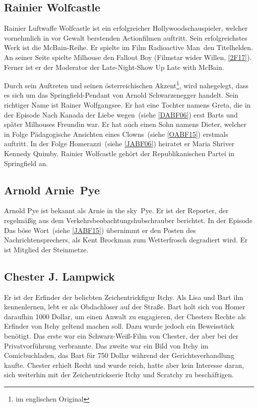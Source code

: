 \subsection{Rainier Wolfcastle}\label{RainierWolfcastle}
Rainier Luftwaffe Wolfcastle ist ein erfolgreicher Hollywoodschauspieler, welcher vornehmlich in vor Gewalt berstenden Actionfilmen auftritt. Sein erfolgreichstes Werk ist die McBain-Reihe. Er spielte im Film \glqq Radioactive Man\grqq\ den Titelhelden. An seiner Seite spielte Milhouse den Fallout Boy (\glqq Filmstar wider Willen\grqq , \ref{2F17}). Ferner ist er der Moderator der Late-Night-Show \glqq Up Late with McBain\grqq .

Durch sein Auftreten und seinen österreichischen Akzent\footnote{im englischen Original}, wird nahegelegt, dass es sich um das Springfield-Pendant von Arnold Schwarzenegger handelt. Sein richtiger Name ist Rainer Wolfgangsee. Er hat eine Tochter namens Greta, die in der Episode \glqq Nach Kanada der Liebe wegen\grqq\ (siehe \ref{DABF06}) erst Barts und später Milhouses Freundin war. Er hat auch einen Sohn namens Dieter, welcher in Folge \glqq Pädagogische Ansichten eines Clowns\grqq\ (siehe \ref{OABF15}) erstmals auftritt. In der Folge \glqq Homerazzi\grqq\ (siehe \ref{JABF06}) heiratet er Maria Shriver Kennedy Quimby. Rainier Wolfcastle gehört der Republikanischen Partei in Springfield an.


\subsection{Arnold \glqq Arnie\grqq\ Pye}\label{ArniePye}
Arnold Pye ist bekannt als Arnie \glqq in the sky\grqq\ Pye. Er ist der Reporter, der regelmäßig aus dem Verkehrsbeobachtungshubschrauber berichtet. In der Episode \glqq Das böse Wort\grqq\ (siehe \ref{JABF15}) übernimmt er den Posten des Nachrichtensprechers, als Kent Brockman zum Wetterfrosch degradiert wird. Er ist Mitglied der Steinmetze.


\subsection{Chester J. Lampwick}
Er ist der Erfinder der beliebten Zeichentrickfigur Itchy. Als Lisa und Bart ihn kennenlernen, lebt er als Obdachloser auf der Straße. Bart holt sich von Homer daraufhin 1000 Dollar, um einen Anwalt zu engagieren, der Chesters Rechte als Erfinder von Itchy geltend machen soll. Dazu wurde jedoch ein Beweisstück benötigt. Das erste war ein Schwarz-Weiß-Film von Chester, der aber bei der Privatvorführung verbrannte. Das zweite war ein Bild von Itchy im Comicbuchladen, das Bart für 750 Dollar während der Gerichtsverhandlung kaufte. Chester erhielt Recht und wurde reich, hatte aber kein Interesse daran, sich weiterhin mit der Zeichentrickserie Itchy und Scratchy zu beschäftigen.

